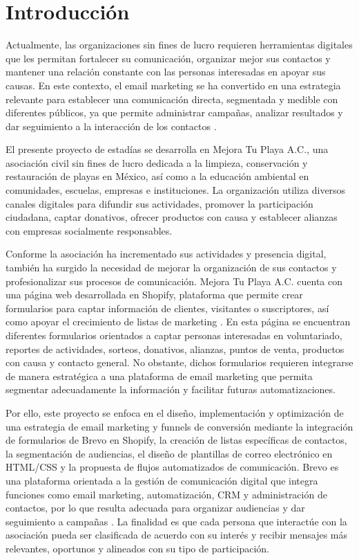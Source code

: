 \section{Introducción}

Actualmente, las organizaciones sin fines de lucro requieren herramientas digitales que les permitan fortalecer su comunicación, organizar mejor sus contactos y mantener una relación constante con las personas interesadas en apoyar sus causas. En este contexto, el email marketing se ha convertido en una estrategia relevante para establecer una comunicación directa, segmentada y medible con diferentes públicos, ya que permite administrar campañas, analizar resultados y dar seguimiento a la interacción de los contactos \cite{brevo_platform,mailchimp_benchmarks}.

El presente proyecto de estadías se desarrolla en Mejora Tu Playa A.C., una asociación civil sin fines de lucro dedicada a la limpieza, conservación y restauración de playas en México, así como a la educación ambiental en comunidades, escuelas, empresas e instituciones. La organización utiliza diversos canales digitales para difundir sus actividades, promover la participación ciudadana, captar donativos, ofrecer productos con causa y establecer alianzas con empresas socialmente responsables.

Conforme la asociación ha incrementado sus actividades y presencia digital, también ha surgido la necesidad de mejorar la organización de sus contactos y profesionalizar sus procesos de comunicación. Mejora Tu Playa A.C. cuenta con una página web desarrollada en Shopify, plataforma que permite crear formularios para captar información de clientes, visitantes o suscriptores, así como apoyar el crecimiento de listas de marketing \cite{shopify_forms}. En esta página se encuentran diferentes formularios orientados a captar personas interesadas en voluntariado, reportes de actividades, sorteos, donativos, alianzas, puntos de venta, productos con causa y contacto general. No obstante, dichos formularios requieren integrarse de manera estratégica a una plataforma de email marketing que permita segmentar adecuadamente la información y facilitar futuras automatizaciones.

Por ello, este proyecto se enfoca en el diseño, implementación y optimización de una estrategia de email marketing y funnels de conversión mediante la integración de formularios de Brevo en Shopify, la creación de listas específicas de contactos, la segmentación de audiencias, el diseño de plantillas de correo electrónico en HTML/CSS y la propuesta de flujos automatizados de comunicación. Brevo es una plataforma orientada a la gestión de comunicación digital que integra funciones como email marketing, automatización, CRM y administración de contactos, por lo que resulta adecuada para organizar audiencias y dar seguimiento a campañas \cite{brevo_platform}. La finalidad es que cada persona que interactúe con la asociación pueda ser clasificada de acuerdo con su interés y recibir mensajes más relevantes, oportunos y alineados con su tipo de participación.

